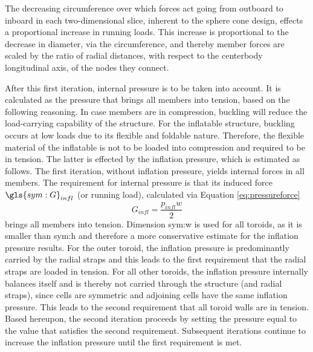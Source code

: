 The decreasing circumference over which forces act going from outboard to inboard in each two-dimensional slice, inherent to the sphere cone design, effects a proportional increase in running loads. This increase is proportional to the decrease in diameter, via the circumference, and thereby member forces are scaled by the ratio of radial distances, with respect to the centerbody longitudinal axis, of the nodes they connect.

After this first iteration, internal pressure is to be taken into account. It is calculated as the pressure that brings all members into tension, based on the following reasoning. In case members are in compression, buckling will reduce the load-carrying capability of the structure. For the inflatable structure, buckling occurs at low loads due to its flexible and foldable nature. Therefore, the flexible material of the inflatable is not to be loaded into compression and required to be in tension. The latter is effected by the inflation pressure, which is estimated as follows. The first iteration, without inflation pressure, yields internal forces in all members. The requirement for internal pressure is that its induced force $\gls{sym:G}_{infl}$ (or running load), calculated via Equation \ref{eq:pressureforce} \cite{XXX}
\begin{equation}
G_{infl} = \frac{p_{infl} w}{2}
\label{eq:pressureforce}
\end{equation}
brings all members into tension. Dimension \gls{sym:w} is used for all toroids, as it is smaller than \gls{sym:h} and therefore a more conservative estimate for the inflation pressure results. For the outer toroid, the inflation pressure is predominantly carried by the radial straps and this leads to the first requirement that the radial straps are loaded in tension. For all other toroids, the inflation pressure internally balances itself and is thereby not carried through the structure (and radial straps), since cells are symmetric and adjoining cells have the same inflation pressure. This leads to the second requirement that all toroid walls are in tension. Based hereupon, the second iteration proceeds by setting the pressure equal to the value that satisfies the second requirement. Subsequent iterations continue to increase the inflation pressure until the first requirement is met. 

